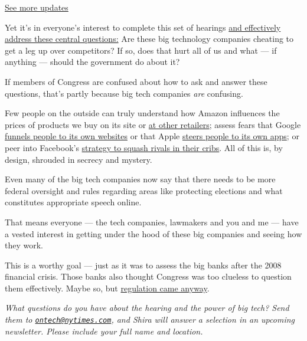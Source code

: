 \href{https://www.nytimes.com/live/2020/07/29/technology/tech-ceos-hearing-testimony?action=click\&pgtype=Article\&state=default\&region=MAIN_CONTENT_1\&context=storylines_live_updates}{See
more updates}

Yet it's in everyone's interest to complete this set of hearings
\href{https://www.nytimes.com/2020/05/22/technology/google-antitrust.html}{and
effectively address these central questions:} Are these big technology
companies cheating to get a leg up over competitors? If so, does that
hurt all of us and what --- if anything --- should the government do
about it?

If members of Congress are confused about how to ask and answer these
questions, that's partly because big tech companies \emph{are}
confusing.

Few people on the outside can truly understand how Amazon influences the
prices of products we buy on its site or
\href{https://www.bloomberg.com/news/articles/2019-08-05/amazon-is-squeezing-sellers-that-offer-better-prices-on-walmart}{at
other retailers}; assess fears that Google
\href{https://themarkup.org/google-the-giant/2020/07/28/google-search-results-prioritize-google-products-over-competitors}{funnels
people to its own websites} or that Apple
\href{https://www.nytimes.com/interactive/2019/09/09/technology/apple-app-store-competition.html}{steers
people to its own apps}; or peer into Facebook's
\href{https://www.nytimes.com/2018/12/05/technology/facebook-emails-privacy-data.html}{strategy
to squash rivals in their cribs}. All of this is, by design, shrouded in
secrecy and mystery.

Even many of the big tech companies now say that there needs to be more
federal oversight and rules regarding areas like protecting elections
and what constitutes appropriate speech online.

That means everyone --- the tech companies, lawmakers and you and me ---
have a vested interest in getting under the hood of these big companies
and seeing how they work.

This is a worthy goal --- just as it was to assess the big banks after
the 2008 financial crisis. Those banks also thought Congress was too
clueless to question them effectively. Maybe so, but
\href{https://www.nytimes.com/2010/07/16/business/16regulate.html}{regulation
came anyway}.

\emph{What questions do you have about the hearing and the power of big
tech? Send them to
\href{mailto:ontech@nytimes.com}{\nolinkurl{ontech@nytimes.com}}, and
Shira will answer a selection in an upcoming newsletter. Please include
your full name and location.}

